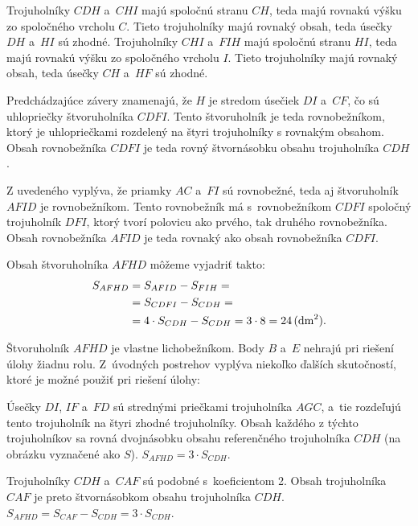 {%
Trojuholníky $CDH$ a~$CHI$ majú spoločnú stranu $CH$, teda majú rovnakú výšku zo spoločného vrcholu $C$.
Tieto trojuholníky majú rovnaký obsah, teda úsečky $DH$ a~$HI$ sú zhodné.
Trojuholníky $CHI$ a~$FIH$ majú spoločnú stranu $HI$, teda majú rovnakú výšku zo spoločného vrcholu $I$.
Tieto trojuholníky majú rovnaký obsah, teda úsečky $CH$ a~$HF$ sú zhodné.

Predchádzajúce závery znamenajú, že $H$ je stredom úsečiek $DI$ a~$CF$, čo sú uhlopriečky štvoruholníka $CDFI$.
Tento štvoruholník je teda rovnobežníkom, ktorý je uhlopriečkami rozdelený na štyri trojuholníky s rovnakým obsahom.
Obsah rovnobežníka $CDFI$ je teda rovný štvornásobku obsahu trojuholníka $CDH$.

Z uvedeného vyplýva, že priamky $AC$ a~$FI$ sú rovnobežné, teda aj štvoruholník $AFID$ je rovnobežníkom.
Tento rovnobežník má s~rovnobežníkom $CDFI$ spoločný trojuholník $DFI$, ktorý tvorí polovicu ako prvého, tak druhého rovnobežníka.
Obsah rovnobežníka $AFID$ je teda rovnaký ako obsah rovnobežníka $CDFI$.

Obsah štvoruholníka $AFHD$ môžeme vyjadriť takto:
$$
\aligned
S_{AFHD} &=S_{AFID}-S_{FIH} = \\
&=S_{CDFI}-S_{CDH} = \\
&=4\cdot S_{CDH}-S_{CDH} =3\cdot8 =24\,(\text{dm}^2).
\endaligned
$$
%


\poznamky
Štvoruholník $AFHD$ je vlastne lichobežníkom.
Body $B$ a~$E$ nehrajú pri riešení úlohy žiadnu rolu.
Z~úvodných postrehov vyplýva niekoľko ďalších skutočností, ktoré je možné použiť pri riešení úlohy:

Úsečky $DI$, $IF$ a~$FD$ sú strednými priečkami trojuholníka $AGC$, a~tie rozdeľujú tento trojuholník na štyri zhodné trojuholníky.
Obsah každého z týchto trojuholníkov sa rovná dvojnásobku obsahu referenčného trojuholníka $CDH$ (na obrázku vyznačené ako $S$).
$S_{AFHD}=3\cdot S_{CDH}$.
%


Trojuholníky $CDH$ a~$CAF$ sú podobné s~koeficientom 2.
Obsah trojuholníka $CAF$ je preto štvornásobkom obsahu trojuholníka $CDH$.
$S_{AFHD}=S_{CAF}-S_{CDH}={3\cdot S_{CDH}}$.
}


